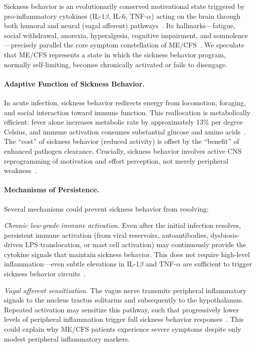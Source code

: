 \begin{speculation}
\label{spec:sickness-behavior-stuck}

Sickness behavior is an evolutionarily conserved motivational state triggered by pro-inflammatory cytokines (IL-1$\beta$, IL-6, TNF-$\alpha$) acting on the brain through both humoral and neural (vagal afferent) pathways~\cite{Dantzer2008inflammation,Dantzer2007twenty}. Its hallmarks---fatigue, social withdrawal, anorexia, hyperalgesia, cognitive impairment, and somnolence---precisely parallel the core symptom constellation of ME/CFS~\cite{Morris2013sickness}. We speculate that ME/CFS represents a state in which the sickness behavior program, normally self-limiting, becomes chronically activated or fails to disengage.

\paragraph{Adaptive Function of Sickness Behavior.}
In acute infection, sickness behavior redirects energy from locomotion, foraging, and social interaction toward immune function. This reallocation is metabolically efficient: fever alone increases metabolic rate by approximately 13\% per degree Celsius, and immune activation consumes substantial glucose and amino acids~\cite{Dantzer2023evolutionary}. The ``cost'' of sickness behavior (reduced activity) is offset by the ``benefit'' of enhanced pathogen clearance. Crucially, sickness behavior involves active CNS reprogramming of motivation and effort perception, not merely peripheral weakness~\cite{Lopes2021sickness}.

\paragraph{Mechanisms of Persistence.}
Several mechanisms could prevent sickness behavior from resolving:

\textit{Chronic low-grade immune activation.} Even after the initial infection resolves, persistent immune activation (from viral reservoirs, autoantibodies, dysbiosis-driven LPS translocation, or mast cell activation) may continuously provide the cytokine signals that maintain sickness behavior. This does not require high-level inflammation---even subtle elevations in IL-1$\beta$ and TNF-$\alpha$ are sufficient to trigger sickness behavior circuits~\cite{Dantzer2008inflammation}.

\textit{Vagal afferent sensitization.} The vagus nerve transmits peripheral inflammatory signals to the nucleus tractus solitarius and subsequently to the hypothalamus. Repeated activation may sensitize this pathway, such that progressively lower levels of peripheral inflammation trigger full sickness behavior responses~\cite{Huerta2025vagal}. This could explain why ME/CFS patients experience severe symptoms despite only modest peripheral inflammatory markers.


\end{speculation}
